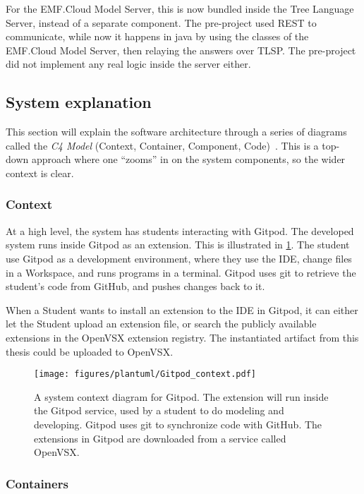For the EMF.Cloud Model Server, this is now bundled inside the Tree Language Server, instead of a separate component.
The pre-project used \gls{REST} to communicate, while now it happens in java by using the classes of the EMF.Cloud Model Server, then relaying the answers over \acrshort{TLSP}.
The pre-project did not implement any real logic inside the server either.


\subsection{System explanation}
This section will explain the software architecture through a series of diagrams called the \textit{C4 Model} (Context, Container, Component, Code)~\cite{simonbrownC4ModelVisualising}.
This is a top-down approach where one ``zooms'' in on the system components, so the wider context is clear.


\subsubsection{Context}
At a high level, the system has students interacting with \gls{Gitpod}.
The developed system runs inside \gls{Gitpod} as an extension.
This is illustrated in \cref{fig:gitpod-system-context}.
The student use \gls{Gitpod} as a development environment, where they use the \acrshort{IDE}, change files in a Workspace, and runs programs in a terminal.
\Gls{Gitpod} uses \gls{git} to retrieve the student's code from \gls{GitHub}, and pushes changes back to it.

When a Student wants to install an extension to the \acrshort{IDE} in \gls{Gitpod}, it can either let the Student upload an extension file, or search the publicly available extensions in the OpenVSX extension registry.
The instantiated artifact from this thesis could be uploaded to OpenVSX.


\begin{figure}[H]  %
  \centering
  \texttt{[image: figures/plantuml/Gitpod\_context.pdf]}
  \caption[System context diagram for Gitpod]{A system context diagram for Gitpod. The extension will run inside the Gitpod service, used by a student to do modeling and developing. Gitpod uses git to synchronize code with GitHub. The extensions in Gitpod are downloaded from a service called OpenVSX.}\label{fig:gitpod-system-context}
\end{figure}

\subsubsection{Containers}

